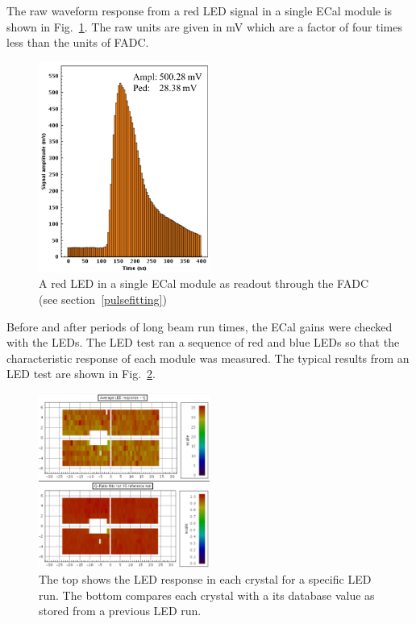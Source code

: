 The raw waveform response from a red LED signal in a single ECal module is shown in Fig.~\ref{Figure:redSignal}. The raw units are given in mV which are a factor of four times less than the units of FADC.

\begin{figure}[H]
  \centering
      \includegraphics[width=0.5\textwidth]{pics/experiment/ledSignal.png}
  \caption[LED signal in ECal FADC]{A red LED in a single ECal module as readout through the FADC (see section~\ref{pulsefitting})}
  \label{Figure:redSignal}
\end{figure}

Before and after periods of long beam run times, the ECal gains were checked with the LEDs. The LED test ran a sequence of red and blue LEDs so that the characteristic response of each module was measured. The typical results from an LED test are shown in Fig.~\ref{Figure:redCompare}.

\begin{figure}[H]
  \centering
      \includegraphics[width=0.5\textwidth]{pics/experiment/ledCompare.png}
  \caption[Results of a single LED run]{The top shows the LED response in each crystal for a specific LED run. The bottom compares each crystal with a its database value as stored from a previous LED run.}
  \label{Figure:redCompare}
\end{figure}

